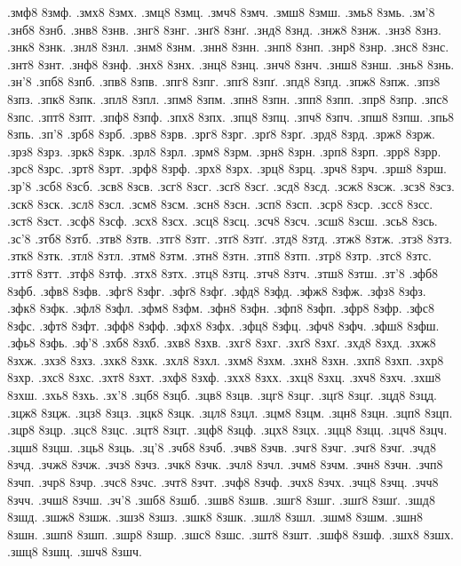 {.змф8 8змф.
.змх8 8змх.
.змц8 8змц.
.змч8 8змч.
.змш8 8змш.
.змь8 8змь.
.зм'8
.знб8 8знб.
.знв8 8знв.
.знг8 8знг.
.знґ8 8знґ.
.знд8 8знд.
.знж8 8знж.
.знз8 8знз.
.знк8 8знк.
.знл8 8знл.
.знм8 8знм.
.знн8 8знн.
.знп8 8знп.
.знр8 8знр.
.знс8 8знс.
.знт8 8знт.
.знф8 8знф.
.знх8 8знх.
.знц8 8знц.
.знч8 8знч.
.знш8 8знш.
.знь8 8знь.
.зн'8
.зпб8 8зпб.
.зпв8 8зпв.
.зпг8 8зпг.
.зпґ8 8зпґ.
.зпд8 8зпд.
.зпж8 8зпж.
.зпз8 8зпз.
.зпк8 8зпк.
.зпл8 8зпл.
.зпм8 8зпм.
.зпн8 8зпн.
.зпп8 8зпп.
.зпр8 8зпр.
.зпс8 8зпс.
.зпт8 8зпт.
.зпф8 8зпф.
.зпх8 8зпх.
.зпц8 8зпц.
.зпч8 8зпч.
.зпш8 8зпш.
.зпь8 8зпь.
.зп'8
.зрб8 8зрб.
.зрв8 8зрв.
.зрг8 8зрг.
.зрґ8 8зрґ.
.зрд8 8зрд.
.зрж8 8зрж.
.зрз8 8зрз.
.зрк8 8зрк.
.зрл8 8зрл.
.зрм8 8зрм.
.зрн8 8зрн.
.зрп8 8зрп.
.зрр8 8зрр.
.зрс8 8зрс.
.зрт8 8зрт.
.зрф8 8зрф.
.зрх8 8зрх.
.зрц8 8зрц.
.зрч8 8зрч.
.зрш8 8зрш.
.зр'8
.зсб8 8зсб.
.зсв8 8зсв.
.зсг8 8зсг.
.зсґ8 8зсґ.
.зсд8 8зсд.
.зсж8 8зсж.
.зсз8 8зсз.
.зск8 8зск.
.зсл8 8зсл.
.зсм8 8зсм.
.зсн8 8зсн.
.зсп8 8зсп.
.зср8 8зср.
.зсс8 8зсс.
.зст8 8зст.
.зсф8 8зсф.
.зсх8 8зсх.
.зсц8 8зсц.
.зсч8 8зсч.
.зсш8 8зсш.
.зсь8 8зсь.
.зс'8
.зтб8 8зтб.
.зтв8 8зтв.
.зтг8 8зтг.
.зтґ8 8зтґ.
.зтд8 8зтд.
.зтж8 8зтж.
.зтз8 8зтз.
.зтк8 8зтк.
.зтл8 8зтл.
.зтм8 8зтм.
.зтн8 8зтн.
.зтп8 8зтп.
.зтр8 8зтр.
.зтс8 8зтс.
.зтт8 8зтт.
.зтф8 8зтф.
.зтх8 8зтх.
.зтц8 8зтц.
.зтч8 8зтч.
.зтш8 8зтш.
.зт'8
.зфб8 8зфб.
.зфв8 8зфв.
.зфг8 8зфг.
.зфґ8 8зфґ.
.зфд8 8зфд.
.зфж8 8зфж.
.зфз8 8зфз.
.зфк8 8зфк.
.зфл8 8зфл.
.зфм8 8зфм.
.зфн8 8зфн.
.зфп8 8зфп.
.зфр8 8зфр.
.зфс8 8зфс.
.зфт8 8зфт.
.зфф8 8зфф.
.зфх8 8зфх.
.зфц8 8зфц.
.зфч8 8зфч.
.зфш8 8зфш.
.зфь8 8зфь.
.зф'8
.зхб8 8зхб.
.зхв8 8зхв.
.зхг8 8зхг.
.зхґ8 8зхґ.
.зхд8 8зхд.
.зхж8 8зхж.
.зхз8 8зхз.
.зхк8 8зхк.
.зхл8 8зхл.
.зхм8 8зхм.
.зхн8 8зхн.
.зхп8 8зхп.
.зхр8 8зхр.
.зхс8 8зхс.
.зхт8 8зхт.
.зхф8 8зхф.
.зхх8 8зхх.
.зхц8 8зхц.
.зхч8 8зхч.
.зхш8 8зхш.
.зхь8 8зхь.
.зх'8
.зцб8 8зцб.
.зцв8 8зцв.
.зцг8 8зцг.
.зцґ8 8зцґ.
.зцд8 8зцд.
.зцж8 8зцж.
.зцз8 8зцз.
.зцк8 8зцк.
.зцл8 8зцл.
.зцм8 8зцм.
.зцн8 8зцн.
.зцп8 8зцп.
.зцр8 8зцр.
.зцс8 8зцс.
.зцт8 8зцт.
.зцф8 8зцф.
.зцх8 8зцх.
.зцц8 8зцц.
.зцч8 8зцч.
.зцш8 8зцш.
.зць8 8зць.
.зц'8
.зчб8 8зчб.
.зчв8 8зчв.
.зчг8 8зчг.
.зчґ8 8зчґ.
.зчд8 8зчд.
.зчж8 8зчж.
.зчз8 8зчз.
.зчк8 8зчк.
.зчл8 8зчл.
.зчм8 8зчм.
.зчн8 8зчн.
.зчп8 8зчп.
.зчр8 8зчр.
.зчс8 8зчс.
.зчт8 8зчт.
.зчф8 8зчф.
.зчх8 8зчх.
.зчц8 8зчц.
.зчч8 8зчч.
.зчш8 8зчш.
.зч'8
.зшб8 8зшб.
.зшв8 8зшв.
.зшг8 8зшг.
.зшґ8 8зшґ.
.зшд8 8зшд.
.зшж8 8зшж.
.зшз8 8зшз.
.зшк8 8зшк.
.зшл8 8зшл.
.зшм8 8зшм.
.зшн8 8зшн.
.зшп8 8зшп.
.зшр8 8зшр.
.зшс8 8зшс.
.зшт8 8зшт.
.зшф8 8зшф.
.зшх8 8зшх.
.зшц8 8зшц.
.зшч8 8зшч.
}
